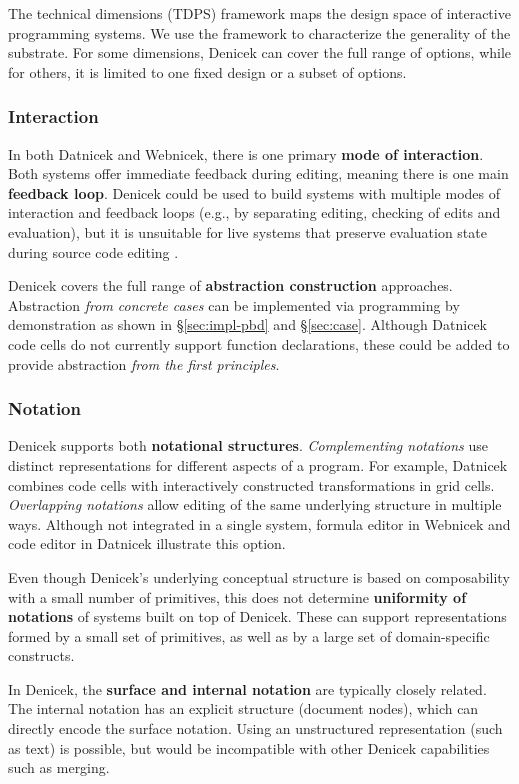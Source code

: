 \documentclass[sigconf]{acmart}
\begin{document}
The technical dimensions (TDPS) framework \cite{jakubovic-2023-techdims} maps the design space of
interactive programming systems. We use the framework to characterize the generality of the
substrate.  For some dimensions, Denicek can cover the full range of options, while for others,
it is limited to one fixed design or a subset of options.

\subsubsection*{Interaction}
In both Datnicek and Webnicek, there is one primary \textbf{mode of interaction}. Both
systems offer immediate feedback during editing, meaning there is one main \textbf{feedback loop}.
Denicek could be used to build systems with multiple modes of interaction and feedback loops
(e.g., by separating editing, checking of edits and evaluation), but it is unsuitable for live
systems that preserve evaluation state during source code editing \cite{burckhardt-2013-live}.

Denicek covers the full range of \textbf{abstraction construction} approaches.
Abstraction \emph{from concrete cases} can be implemented via programming by demonstration as
shown in \S\ref{sec:impl-pbd} and \S\ref{sec:case}. Although Datnicek code cells do not currently
support function declarations, these could be added to provide abstraction \emph{from the
first principles}.

\subsubsection*{Notation}
Denicek supports both \textbf{notational structures}. \emph{Complementing notations} use
distinct representations for different aspects of a program. For example, Datnicek combines code cells with
interactively constructed transformations in grid cells. \emph{Overlapping notations} allow editing
of the same underlying structure in multiple ways. Although not integrated in a single system,
formula editor in Webnicek and code editor in Datnicek illustrate this option.

Even though Denicek's underlying conceptual structure is based on composability with a small number of
primitives, this does not determine \textbf{uniformity of notations} of systems built on top
of Denicek. These can support representations formed by a small set of primitives, as well as
by a large set of domain-specific constructs.

In Denicek, the \textbf{surface and internal notation} are typically closely related. The
internal notation has an explicit structure (document nodes), which can directly encode the surface
notation. Using an unstructured representation (such as text) is possible, but would be
incompatible with other Denicek capabilities such as merging.
\end{document}
